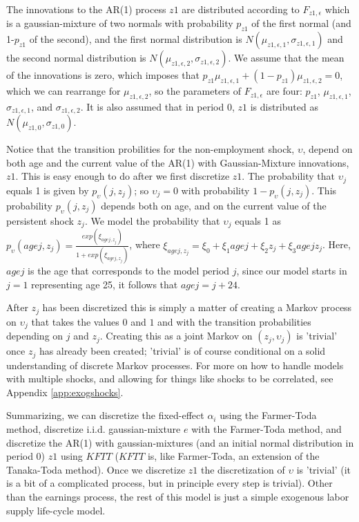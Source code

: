 The innovations to the AR(1) process $z1$ are distributed according to $F_{z1,\epsilon}$ which is a gaussian-mixture of two normals with probability $p_{z1}$ of the first normal (and 1-$p_{z1}$ of the second), and the first normal distribution is $N(\mu_{z1,\epsilon,1}, \sigma_{z1,\epsilon,1})$ and the second normal distribution is $N(\mu_{z1,\epsilon,2}, \sigma_{z1,\epsilon,2})$. We assume that the mean of the innovations is zero, which imposes that $p_{z1}\mu_{z1,\epsilon,1}+ (1-p_{z1})\mu_{z1,\epsilon,2}=0$, which we can rearrange for $\mu_{z1,\epsilon,2}$, so the parameters of $F_{z1,\epsilon}$ are four: $p_{z1}$, $\mu_{z1,\epsilon,1}$, $\sigma_{z1,\epsilon,1}$, and  $\sigma_{z1,\epsilon,2}$. It is also assumed that in period 0, $z1$ is distributed as $N(\mu_{z1,0}, \sigma_{z1,0})$.

Notice that the transition probilities for the non-employment shock, $\upsilon$, depend on both age and the current value of the AR(1) with Gaussian-Mixture innovations, $z1$. This is easy enough to do after we first discretize $z1$. The probability that $\upsilon_j$ equals 1 is given by $p_{\upsilon}(j,z_j)$; so $\upsilon_j=0$ with probability $1-p_{\upsilon}(j,z_j)$. This probability $p_{\upsilon}(j,z_j)$ depends both on age, and on the current value of the persistent shock $z_j$. We model the probability that $\upsilon_j$ equals 1 as $p_{\upsilon}(agej,z_j)=\frac{exp(\xi_{agej,z_j})}{1+exp(\xi_{agej,z_j})}$, where $\xi_{agej,z_j}=\xi_0+\xi_1 agej + \xi_2 z_j + \xi_3 agej z_j$. Here, $agej$ is the age that corresponds to the model period $j$, since our model starts in $j=1$ representing age 25, it follows that $agej=j+24$.

After $z_j$ has been discretized this is simply a matter of creating a Markov process on $\upsilon_j$ that takes the values $0$ and $1$ and with the transition probabilities depending on $j$ and $z_j$. Creating this as a joint Markov on $(z_j,\upsilon_j)$ is 'trivial' once $z_j$ has already been created; 'trivial' is of course conditional on a solid understanding of discrete Markov processes. For more on how to handle models with multiple shocks, and allowing for things like shocks to be correlated, see Appendix \ref{app:exogshocks}.

Summarizing, we can discretize the fixed-effect $\alpha_i$ using the Farmer-Toda method, discretize i.i.d. gaussian-mixture $e$ with the Farmer-Toda method, and discretize the AR(1) with gaussian-mixtures (and an initial normal distribution in period 0) $z1$ using $KFTT$ ($KFTT$ is, like Farmer-Toda, an extension of the Tanaka-Toda method). Once we discretize $z1$ the discretization of $\upsilon$ is 'trivial' (it is a bit of a complicated process, but in principle every step is trivial). Other than the earnings process, the rest of this model is just a simple exogenous labor supply life-cycle model.


